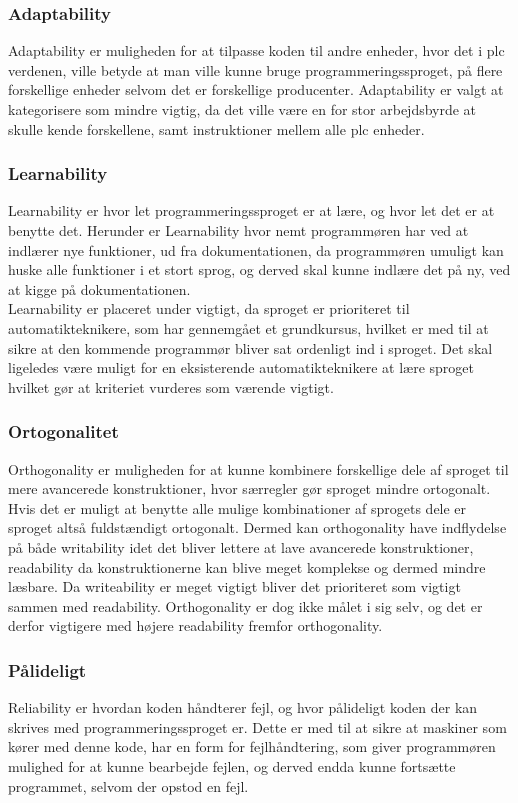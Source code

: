 \subsubsection{Adaptability} Adaptability er muligheden for at tilpasse koden til andre enheder, hvor det i \gls{plc} verdenen, ville betyde at man ville kunne bruge programmeringssproget, på flere forskellige enheder selvom det er forskellige producenter. Adaptability er valgt at kategorisere som mindre vigtig, da det ville være en for stor arbejdsbyrde at skulle kende forskellene, samt instruktioner mellem alle \gls{plc} enheder.

\subsubsection{Learnability} Learnability er hvor let programmeringssproget er at lære, og hvor let det er at benytte det. Herunder er Learnability hvor nemt programmøren har ved at indlærer nye funktioner, ud fra dokumentationen, da programmøren umuligt kan huske alle funktioner i et stort sprog, og derved skal kunne indlære det på ny, ved at kigge på dokumentationen. \\
Learnability er placeret under vigtigt, da sproget er prioriteret til automatikteknikere, som har gennemgået et grundkursus, hvilket er med til at sikre at den kommende programmør bliver sat ordenligt ind i sproget. Det skal ligeledes være muligt for en eksisterende automatikteknikere at lære sproget hvilket gør at kriteriet vurderes som værende vigtigt.

\subsubsection{Ortogonalitet} Orthogonality er muligheden for at kunne kombinere forskellige dele af sproget til mere avancerede konstruktioner, hvor særregler gør sproget mindre ortogonalt. Hvis det er muligt at benytte alle mulige kombinationer af sprogets dele er sproget altså fuldstændigt ortogonalt. Dermed kan orthogonality have indflydelse på både writability idet det bliver lettere at lave avancerede konstruktioner, readability da konstruktionerne kan blive meget komplekse og dermed mindre læsbare. Da writeability er meget vigtigt bliver det prioriteret som vigtigt sammen med readability. Orthogonality er dog ikke målet i sig selv, og det er derfor vigtigere med højere readability fremfor orthogonality.

\subsubsection{Pålideligt} Reliability er hvordan koden håndterer fejl, og hvor pålideligt koden der kan skrives med programmeringssproget er. Dette er med til at sikre at maskiner som kører med denne kode, har en form for fejlhåndtering, som giver programmøren mulighed for at kunne bearbejde fejlen, og derved endda kunne fortsætte programmet, selvom der opstod en fejl.


